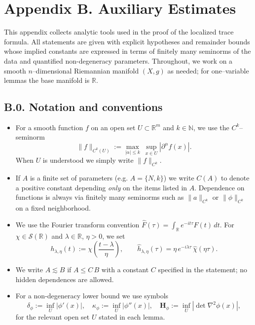 
\section*{Appendix B. Auxiliary Estimates}
\label{app:B}

\noindent
This appendix collects analytic tools used in the proof of the localized trace formula. All statements are given with explicit hypotheses and remainder bounds whose implied constants are expressed in terms of finitely many seminorms of the data and quantified non-degeneracy parameters. Throughout, we work on a smooth $n$–dimensional Riemannian manifold $(X,g)$ as needed; for one–variable lemmas the base manifold is $\mathbb{R}$.

\subsection*{B.0. Notation and conventions}
\label{appB:notation}

\begin{itemize}
  \item For a smooth function $f$ on an open set $U\subset \mathbb{R}^m$ and $k\in \mathbb{N}$, we use the $C^k$–seminorm
  \[
  \|f\|_{C^k(U)} := \max_{|\alpha|\le k}\ \sup_{x\in U} |\partial^\alpha f(x)| .
  \]
  When $U$ is understood we simply write $\|f\|_{C^k}$.
  \item If $A$ is a finite set of parameters (e.g. $A=\{N,k\}$) we write $C(A)$ to denote a positive constant depending \emph{only} on the items listed in $A$. Dependence on functions is always via finitely many seminorms such as $\|a\|_{C^k}$ or $\|\phi\|_{C^k}$ on a fixed neighborhood.
  \item We use the Fourier transform convention $\widehat{F}(\tau)=\int_{\mathbb{R}} e^{-i t \tau} F(t)\,dt$. For $\chi\in\mathcal{S}(\mathbb{R})$ and $\lambda\in\mathbb{R}$, $\eta>0$, we set
  \[
  h_{\lambda,\eta}(t):=\chi\!\left(\frac{t-\lambda}{\eta}\right),\qquad
  \widehat{h}_{\lambda,\eta}(\tau)=\eta\,e^{-i\lambda \tau}\,\widehat{\chi}(\eta\tau).
  \]
  \item We write $A\lesssim B$ if $A\le C\,B$ with a constant $C$ specified in the statement; no hidden dependences are allowed.
  \item For a non-degeneracy lower bound we use symbols
  \[
  \delta_\phi := \inf_{U} |\phi'(x)|,\quad \kappa_\phi := \inf_{U} |\phi''(x)|,\quad
  \mathbf{H}_\phi := \inf_{U} |\det \nabla^2\phi(x)|,
  \]
  for the relevant open set $U$ stated in each lemma.
\end{itemize}

